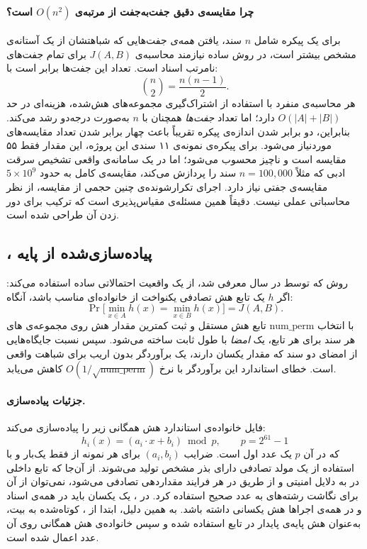 \documentclass[11pt,a4paper]{article}
\begin{document}
	\paragraph{چرا مقایسه‌ی دقیق جفت‌به‌جفت از مرتبه‌ی $O(n^2)$ است؟}
	برای یک پیکره شامل $n$ سند، یافتن \emph{همه‌ی} جفت‌هایی که شباهتشان از یک آستانه‌ی مشخص بیشتر است، در روش ساده نیازمند محاسبه‌ی $J(A,B)$ برای تمام جفت‌های نامرتب اسناد است. تعداد این جفت‌ها برابر است با:
	$$
	\binom{n}{2} = \frac{n(n-1)}{2}.
	$$
	هر محاسبه‌ی منفرد  با استفاده از اشتراک‌گیری مجموعه‌های هش‌شده، هزینه‌ای در حد $O(|A| + |B|)$ دارد؛ اما تعداد \emph{جفت‌ها} همچنان با $n$ به‌صورت درجه‌دو رشد می‌کند. بنابراین، دو برابر شدن اندازه‌ی پیکره تقریباً باعث چهار برابر شدن تعداد مقایسه‌های موردنیاز می‌شود. برای پیکره‌ی نمونه‌ی ۱۱ سندی این پروژه، این مقدار فقط ۵۵ مقایسه است و ناچیز محسوب می‌شود؛ اما در یک سامانه‌ی واقعی تشخیص سرقت ادبی که مثلاً $n = 100{,}000$ سند را پردازش می‌کند، مقایسه‌ی کامل به حدود $5 \times 10^9$ مقایسه‌ی جفتی نیاز دارد. اجرای تکرارشونده‌ی چنین حجمی از مقایسه، از نظر محاسباتی عملی نیست. دقیقاً همین مسئله‌ی مقیاس‌پذیری است که ترکیب  برای دور زدن آن طراحی شده است.
	
	\subsection{، پیاده‌سازی‌شده از پایه}
	
	روش  که توسط  در سال  معرفی شد، از یک واقعیت احتمالاتی ساده استفاده می‌کند: اگر $h$ یک تابع هش تصادفی یکنواخت از خانواده‌ای مناسب باشد، آنگاه:
	$$
	\Pr\big[\min_{x \in A} h(x) = \min_{x \in B} h(x)\big] = J(A, B).
	$$
	با انتخاب $\text{num\_perm}$ تابع هش مستقل و ثبت کمترین مقدار هش روی مجموعه‌ی های هر سند برای هر تابع، یک \emph{امضا} با طول ثابت ساخته می‌شود. سپس نسبت جایگاه‌هایی از امضای دو سند که مقدار یکسان دارند، یک برآوردگر بدون اریب برای شباهت واقعی  است. خطای استاندارد این برآوردگر با نرخ $O(1/\sqrt{\text{num\_perm}})$ کاهش می‌یابد.
	
	\paragraph{جزئیات پیاده‌سازی.}
	فایل  خانواده‌ی استاندارد هش همگانی زیر را پیاده‌سازی می‌کند:
	$$
	h_i(x) = (a_i \cdot x + b_i) \bmod p, \qquad p = 2^{61} - 1
	$$
	که در آن $p$ یک عدد اول  است. ضرایب $(a_i, b_i)$ برای هر نمونه از  فقط یک‌بار و با استفاده از یک مولد تصادفی دارای بذر مشخص تولید می‌شوند. از آن‌جا که تابع داخلی  در  به دلایل امنیتی و از طریق  در هر فرایند مقداردهی تصادفی می‌شود، نمی‌توان از آن برای نگاشت رشته‌های  به عدد صحیح استفاده کرد. در ، یک  یکسان باید در همه‌ی اسناد و در همه‌ی اجراها هش یکسانی داشته باشد. به همین دلیل، ابتدا از ، کوتاه‌شده به  بیت، به‌عنوان هش پایه‌ی پایدار در تابع  استفاده شده و سپس خانواده‌ی هش همگانی روی آن عدد اعمال شده است.
	
\end{document}
